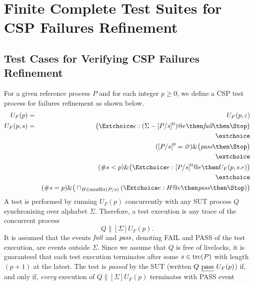 \section{Finite Complete Test Suites for CSP Failures Refinement}
\label{sec:finitecompletefails}


\subsection{Test Cases for Verifying CSP Failures Refinement}

For a given reference process $P$ and for each integer $p\ge 0$, we define a
CSP test process for failures refinement as shown below.
%
\begin{eqnarray}
U_F(p) & = & U_F(p,\varepsilon)
\\
U_F(p,s) & = & \big( \Extchoice e:(\Sigma - [P/s]^0) @ e \then \efail\then \Stop \big)
\label{eq:ufa}
\\ & & \extchoice \nonumber
\\ & & ([P/s]^0 = \varnothing)    \&   \big( \epass \then \Stop \big)
\label{eq:ufb}
\\ & & \extchoice \nonumber
\\ & & (\#s < p) \& \big( \Extchoice e:[P/s]^0 @ e \then U_F(p,s.e) \big)
\label{eq:ufc}
\\ & & \extchoice \nonumber
\\ & & (\#s = p) \& \big( \sqcap_{H\in\text{minHit}(P/s)} ( \Extchoice e:H @ e \then \epass \then\Stop   )  \big)
\label{eq:ufd}
\end{eqnarray}
%
A test is performed by running $U_F(p)$ concurrently with any SUT process $Q$
synchronising over alphabet $\Sigma$. Therefore, a test execution is any
trace of the concurrent process
\[
Q\parallel[\Sigma] U_F(p).
\]
It is assumed that the events ${\text{\it fail}}$ and ${\text{\it pass}}$, denoting FAIL and PASS
of the test execution, are events outside $\Sigma$. Since we assume that $Q$
is free of livelocks, it is guaranteed that each test execution terminates
after some $s\in\text{trc}(P)$ with length $(p+1)$ at the latest. The test is
\emph{passed} by the SUT (written $Q\ \underline{\text{pass}}\ U_F(p)$) if, and only if, {\it
every} execution of $Q\parallel[\Sigma] U_F(p)$ terminates with PASS event
